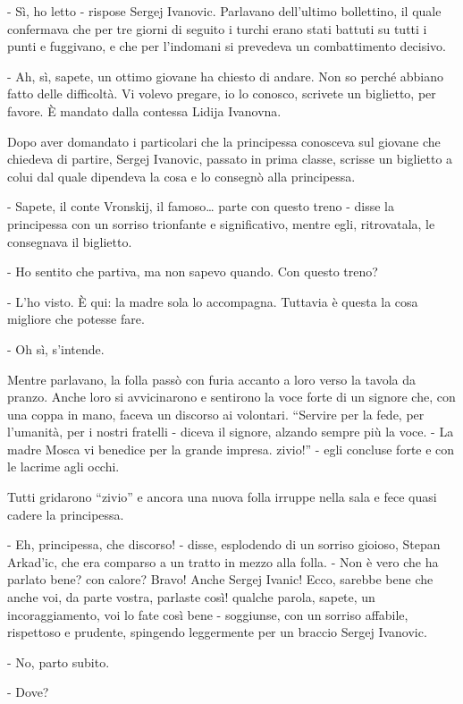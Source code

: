 - Sì, ho letto - rispose Sergej Ivanovic. Parlavano dell'ultimo bollettino, il quale confermava che per tre giorni di seguito i turchi erano stati battuti su tutti i punti e fuggivano, e che per l'indomani si prevedeva un combattimento decisivo. 

- Ah, sì, sapete, un ottimo giovane ha chiesto di andare. Non so perché abbiano fatto delle difficoltà. Vi volevo pregare, io lo conosco, scrivete un biglietto, per favore. È mandato dalla contessa Lidija Ivanovna. 

Dopo aver domandato i particolari che la principessa conosceva sul giovane che chiedeva di partire, Sergej Ivanovic, passato in prima classe, scrisse un biglietto a colui dal quale dipendeva la cosa e lo consegnò alla principessa. 

- Sapete, il conte Vronskij, il famoso\ldots{} parte con questo treno - disse la principessa con un sorriso trionfante e significativo, mentre egli, ritrovatala, le consegnava il biglietto. 

- Ho sentito che partiva, ma non sapevo quando. Con questo treno? 

- L'ho visto. È qui: la madre sola lo accompagna. Tuttavia è questa la cosa migliore che potesse fare. 

- Oh sì, s'intende. 

Mentre parlavano, la folla passò con furia accanto a loro verso la tavola da pranzo. Anche loro si avvicinarono e sentirono la voce forte di un signore che, con una coppa in mano, faceva un discorso ai volontari. ``Servire per la fede, per l'umanità, per i nostri fratelli - diceva il signore, alzando sempre più la voce. - La madre Mosca vi benedice per la grande impresa. zivio!'' - egli concluse forte e con le lacrime agli occhi. 

Tutti gridarono ``zivio'' e ancora una nuova folla irruppe nella sala e fece quasi cadere la principessa. 

- Eh, principessa, che discorso! - disse, esplodendo di un sorriso gioioso, Stepan Arkad'ic, che era comparso a un tratto in mezzo alla folla. - Non è vero che ha parlato bene? con calore? Bravo! Anche Sergej Ivanic! Ecco, sarebbe bene che anche voi, da parte vostra, parlaste così! qualche parola, sapete, un incoraggiamento, voi lo fate così bene - soggiunse, con un sorriso affabile, rispettoso e prudente, spingendo leggermente per un braccio Sergej Ivanovic. 

- No, parto subito. 

- Dove? 

